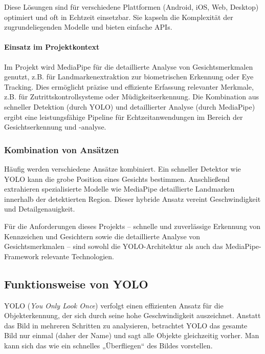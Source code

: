 Diese Lösungen sind für verschiedene Plattformen (Android, iOS, Web, Desktop) optimiert und oft in Echtzeit einsetzbar. Sie kapseln die Komplexität der zugrundeliegenden Modelle und bieten einfache APIs.

\paragraph{Einsatz im Projektkontext}
Im Projekt wird MediaPipe für die detaillierte Analyse von Gesichtsmerkmalen genutzt, z.B. für Landmarkenextraktion zur biometrischen Erkennung oder Eye Tracking. Dies ermöglicht präzise und effiziente Erfassung relevanter Merkmale, z.B. für Zutrittskontrollsysteme oder Müdigkeitserkennung. Die Kombination aus schneller Detektion (durch YOLO) und detaillierter Analyse (durch MediaPipe) ergibt eine leistungsfähige Pipeline für Echtzeitanwendungen im Bereich der Gesichtserkennung und -analyse.

\subsubsection{Kombination von Ansätzen}

Häufig werden verschiedene Ansätze kombiniert. Ein schneller Detektor wie YOLO kann die grobe Position eines Gesichts bestimmen. Anschließend extrahieren spezialisierte Modelle wie MediaPipe detaillierte Landmarken innerhalb der detektierten Region. Dieser hybride Ansatz vereint Geschwindigkeit und Detailgenauigkeit.

Für die Anforderungen dieses Projekts – schnelle und zuverlässige Erkennung von Kennzeichen und Gesichtern sowie die detaillierte Analyse von Gesichtsmerkmalen – sind sowohl die YOLO-Architektur als auch das MediaPipe-Framework relevante Technologien.

\subsection{Funktionsweise von YOLO}

YOLO (\textit{You Only Look Once}) verfolgt einen effizienten Ansatz für die Objekterkennung, der sich durch seine hohe Geschwindigkeit auszeichnet. Anstatt das Bild in mehreren Schritten zu analysieren, betrachtet YOLO das gesamte Bild nur einmal (daher der Name) und sagt alle Objekte gleichzeitig vorher. Man kann sich das wie ein schnelles „Überfliegen“ des Bildes vorstellen.

